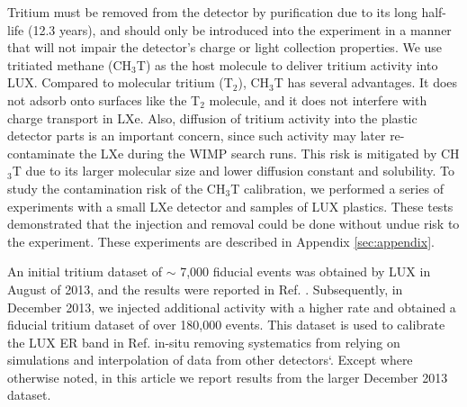 Tritium must be removed from the detector by purification due to its long half-life (12.3 years\cite{Tritium_halflife_all}), and should only be introduced into the experiment in a manner that will not impair the detector's charge or light collection properties. We use tritiated methane (CH$_3$T) as the host molecule to deliver tritium activity into LUX. Compared to molecular tritium (T$_2$), CH$_3$T has several advantages. It does not adsorb onto surfaces like the T$_2$ molecule, and it does not interfere with charge transport in LXe. Also, diffusion of tritium activity into the plastic detector parts is an important concern, since such activity may later re-contaminate the LXe during the WIMP search runs.  This risk is mitigated by CH$_3$T due to its larger molecular size and lower diffusion constant and solubility. To study the contamination risk of the CH$_3$T calibration, we performed a series of experiments with a small LXe detector and samples of LUX plastics. These tests demonstrated that the injection and removal could be done without undue risk to the experiment. These experiments are described in Appendix \ref{sec:appendix}.

An initial tritium dataset of $\sim$ 7,000 fiducial events was obtained by LUX in August of 2013, and the results were reported in Ref. \cite{lux-prl}. Subsequently, in December 2013, we injected additional activity with a higher rate and obtained a fiducial tritium dataset of over 180,000 events. This dataset is used to calibrate the LUX ER band in Ref. \cite{lux-reanalysis} in-situ removing systematics from relying on simulations and interpolation of data from other detectors`. Except where otherwise noted, in this article we report results from the larger December 2013 dataset.